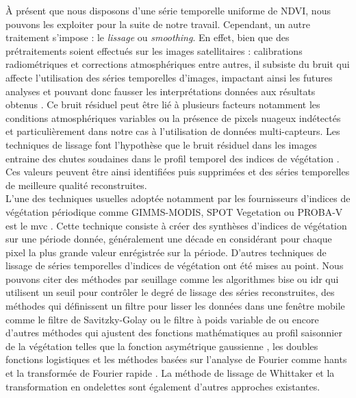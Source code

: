 \`A présent que nous disposons d'une série temporelle uniforme de NDVI, nous pouvons les exploiter pour la suite de notre travail. Cependant, un autre traitement s'impose : le \emph{lissage} ou \emph{smoothing}. En effet, bien que des prétraitements soient effectués sur les images satellitaires : calibrations radiométriques et corrections atmosphériques entre autres, il subsiste du bruit qui affecte l'utilisation des séries temporelles d'images, impactant ainsi les futures analyses et pouvant donc fausser les interprétations données aux résultats obtenus \citep{Chen2004}. Ce bruit résiduel peut être lié à plusieurs facteurs notamment les conditions atmosphériques variables ou la présence de pixels nuageux indétectés et particulièrement dans notre cas à l'utilisation de données multi-capteurs. Les techniques de lissage font l'hypothèse que le bruit résiduel dans les images entraine des chutes soudaines dans le profil temporel des indices de végétation \citep{Bojanowski2009}. Ces valeurs peuvent être ainsi identifiées puis supprimées et des séries temporelles de meilleure qualité reconstruites.
\\L'une des techniques usuelles adoptée notamment par les fournisseurs d'indices de végétation périodique comme GIMMS-MODIS, SPOT Vegetation ou PROBA-V est le \acrshort{mvc} \citep{Holben1986}. Cette technique 
consiste à créer des synthèses d'indices de végétation sur une période donnée, généralement une décade en considérant pour chaque pixel la plus grande valeur enrégistrée sur la période.
D'autres techniques de lissage de séries temporelles d'indices de végétation ont été mises au point. Nous pouvons citer des méthodes par seuillage comme les algorithmes \acrshort{bise} \citep{Viovy1992} ou \acrshort{idr} \citep{Julien2010} qui utilisent un seuil pour contrôler le degré de lissage des séries reconstruites, des méthodes qui définissent un filtre pour lisser les données dans une fenêtre mobile comme le filtre de Savitzky-Golay \citep{Savitzky1964, Chen2004} ou le filtre à poids variable de \citet{Zhu2012} ou encore d'autres méthodes qui ajustent des fonctions mathématiques au profil saisonnier de la végétation telles que la fonction asymétrique gaussienne \citep{Jonsson2002}, les doubles fonctions logistiques \citep{Beck2006} et les méthodes basées sur l'analyse de Fourier comme \acrshort{hants} \citep{Verhoef1996, Roerink2000} et la transformée de Fourier rapide \citep{Menenti1993}. La méthode de lissage de Whittaker \citep{Eilers2003,Atzberger2011} et la transformation en ondelettes \citep{Lu2007} sont également d'autres approches existantes.
